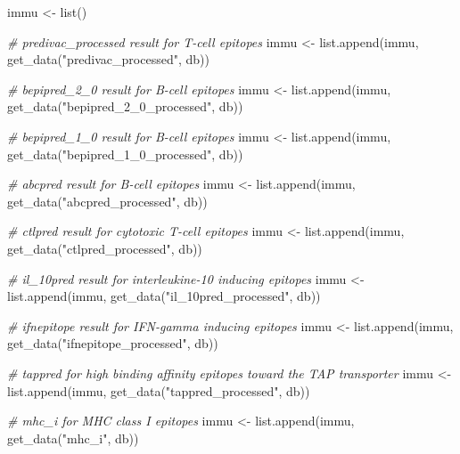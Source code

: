 \documentclass[
  11pt,
  oneside]{book}
\newenvironment{Shaded}{\begin{snugshade}}{\end{snugshade}}
\newcommand{\CommentTok}[1]{\textcolor[rgb]{0.56,0.35,0.01}{\textit{#1}}}
\newcommand{\FunctionTok}[1]{\textcolor[rgb]{0.00,0.00,0.00}{#1}}
\newcommand{\NormalTok}[1]{#1}
\newcommand{\OtherTok}[1]{\textcolor[rgb]{0.56,0.35,0.01}{#1}}
\newcommand{\StringTok}[1]{\textcolor[rgb]{0.31,0.60,0.02}{#1}}
\begin{document}
\begin{Shaded}
\begin{Highlighting}[]
\NormalTok{immu }\OtherTok{\textless{}{-}} \FunctionTok{list}\NormalTok{()}

\CommentTok{\# predivac\_processed result for T{-}cell epitopes}
\NormalTok{immu }\OtherTok{\textless{}{-}} \FunctionTok{list.append}\NormalTok{(immu, }\FunctionTok{get\_data}\NormalTok{(}\StringTok{"predivac\_processed"}\NormalTok{, db))}

\CommentTok{\# bepipred\_2\_0 result for B{-}cell epitopes}
\NormalTok{immu }\OtherTok{\textless{}{-}} \FunctionTok{list.append}\NormalTok{(immu, }\FunctionTok{get\_data}\NormalTok{(}\StringTok{"bepipred\_2\_0\_processed"}\NormalTok{, db))}

\CommentTok{\# bepipred\_1\_0 result for B{-}cell epitopes}
\NormalTok{immu }\OtherTok{\textless{}{-}} \FunctionTok{list.append}\NormalTok{(immu, }\FunctionTok{get\_data}\NormalTok{(}\StringTok{"bepipred\_1\_0\_processed"}\NormalTok{, db))}

\CommentTok{\# abcpred result for B{-}cell epitopes}
\NormalTok{immu }\OtherTok{\textless{}{-}} \FunctionTok{list.append}\NormalTok{(immu, }\FunctionTok{get\_data}\NormalTok{(}\StringTok{"abcpred\_processed"}\NormalTok{, db))}

\CommentTok{\# ctlpred result for cytotoxic T{-}cell epitopes}
\NormalTok{immu }\OtherTok{\textless{}{-}} \FunctionTok{list.append}\NormalTok{(immu, }\FunctionTok{get\_data}\NormalTok{(}\StringTok{"ctlpred\_processed"}\NormalTok{, db))}

\CommentTok{\# il\_10pred result for interleukine{-}10 inducing epitopes}
\NormalTok{immu }\OtherTok{\textless{}{-}} \FunctionTok{list.append}\NormalTok{(immu, }\FunctionTok{get\_data}\NormalTok{(}\StringTok{"il\_10pred\_processed"}\NormalTok{, db))}

\CommentTok{\# ifnepitope result for IFN{-}gamma inducing epitopes}
\NormalTok{immu }\OtherTok{\textless{}{-}} \FunctionTok{list.append}\NormalTok{(immu, }\FunctionTok{get\_data}\NormalTok{(}\StringTok{"ifnepitope\_processed"}\NormalTok{, db))}

\CommentTok{\# tappred for high binding affinity epitopes toward the TAP transporter}
\NormalTok{immu }\OtherTok{\textless{}{-}} \FunctionTok{list.append}\NormalTok{(immu, }\FunctionTok{get\_data}\NormalTok{(}\StringTok{"tappred\_processed"}\NormalTok{, db))}

\CommentTok{\# mhc\_i for MHC class I epitopes}
\NormalTok{immu }\OtherTok{\textless{}{-}} \FunctionTok{list.append}\NormalTok{(immu, }\FunctionTok{get\_data}\NormalTok{(}\StringTok{"mhc\_i"}\NormalTok{, db))}


\end{Highlighting}
\end{Shaded}
\end{document}
